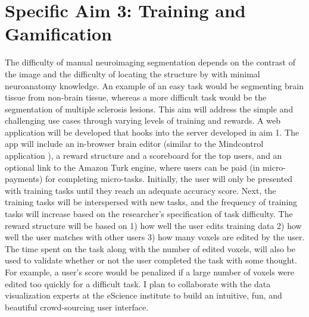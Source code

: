 

\section{Specific Aim 3: Training and Gamification}

The difficulty of manual neuroimaging segmentation depends on the contrast of the image and the difficulty of locating the structure by with minimal neuroanatomy knowledge. An example of an easy task would be segmenting brain tissue from non-brain tissue, whereas a more difficult task would be the segmentation of multiple sclerosis lesions. This aim will address the simple and challenging use cases through varying levels of training and rewards. A web application will be developed that hooks into the server developed in aim 1. The app will include an in-browser brain editor (similar to the Mindcontrol application \cite{keshavan2016mindcontrol}), a reward structure and a scoreboard for the top users, and an optional link to the Amazon Turk engine, where users can be paid (in micro-payments) for completing micro-tasks. Initially, the user will only be presented with training tasks until they reach an adequate accuracy score. Next, the training tasks will be interspersed with new tasks, and the frequency of training tasks will increase based on the researcher's specification of task difficulty. The reward structure will be based on 1) how well the user edits training data 2) how well the user matches with other users 3) how many voxels are edited by the user. The time spent on the task along with the number of edited voxels, will also be used to validate whether or not the user completed the task with some thought. For example, a user's score would be penalized if a large number of voxels were edited too quickly for a difficult task. I plan to collaborate with the data visualization experts at the eScience institute to build an intuitive, fun, and beautiful crowd-sourcing user interface.